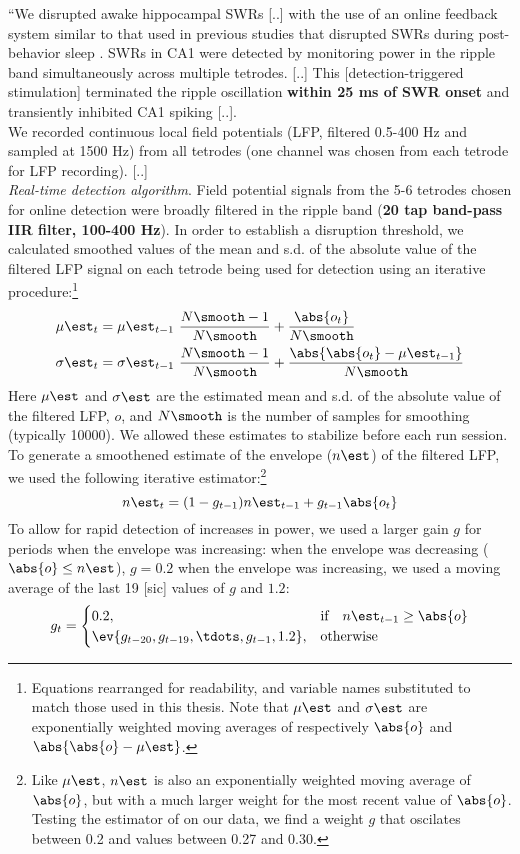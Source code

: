 \begin{quotebar}
``We disrupted awake hippocampal SWRs [..] with the use of an online feedback system similar to that used in previous studies that disrupted SWRs during post-behavior sleep \cite{Girardeau2009,Ego-Stengel2009}. SWRs in CA1 were detected by monitoring power in the ripple band simultaneously across multiple tetrodes. [..] This [detection-triggered stimulation] terminated the ripple oscillation \textbf{within 25 ms of SWR onset} and transiently inhibited CA1 spiking [..].\\
We recorded continuous local field potentials (LFP, filtered 0.5-400 Hz and sampled at 1500 Hz) from all tetrodes (one channel was chosen from each tetrode for LFP recording). [..]\\
\emph{Real-time detection algorithm}. Field potential signals from the 5-6 tetrodes chosen for online detection were broadly filtered in the ripple band (\textbf{20 tap band-pass IIR filter, 100-400 Hz}). In order to establish a disruption threshold, we calculated smoothed values of the mean and s.d. of the absolute value of the filtered LFP signal on each tetrode being used for detection using an iterative procedure:\footnote{Equations rearranged for readability, and variable names substituted to match those used in this thesis. Note that $\mu\est$ and $\sigma\est$ are exponentially weighted moving averages of respectively $\abs{o}$ and $\abs{\abs{o} - \mu\est}$. }
\begin{align*}
\mu\est_t &= \mu\est_{t-1} \ \frac{N\smooth - 1}{N\smooth}
                + \frac{\abs{o_t}}{N\smooth} \\
\sigma\est_t &= \sigma\est_{t-1} \ \frac{N\smooth - 1}{N\smooth}
                + \frac{\abs{\abs{o_t} - \mu\est_{t-1}}}{N\smooth}
\end{align*}
Here $\mu\est$ and $\sigma\est$ are the estimated mean and s.d. of the absolute value of the filtered LFP, $o$, and $N\smooth$ is the  number of samples for smoothing (typically 10000). We allowed these estimates to stabilize before each run session. To generate a smoothened estimate of the envelope ($n\est$) of the filtered LFP, we used the following iterative estimator:\footnote{Like $\mu\est$, $n\est$ is also an exponentially weighted moving average of $\abs{o}$, but with a much larger weight for the most recent value of $\abs{o}$. Testing the estimator of \citeauthor*{Jadhav2012} on our data, we find a weight $g$ that oscilates between 0.2 and values between 0.27 and 0.30.}
\[
n\est_t = (1 - g_{t-1}) n\est_{t-1} + g_{t-1} \abs{o_t}
\]
To allow for rapid detection of increases in power, we used a larger gain $g$ for periods when the envelope was increasing: when the envelope was decreasing ($\abs{o} \le n\est$), $g = 0.2$ when the envelope was increasing, we used a moving average of the last 19 [sic] values of $g$ and $1.2$:
\[
g_t = 
\begin{cases}
    0.2,    & \text{if}\quad n\est_{t-1} \geq \abs{o} \\
    \ev{g_{t-20}, g_{t-19}, \tdots, g_{t-1}, 1.2},  & \text{otherwise}
\end{cases}
\]


\end{quotebar}
